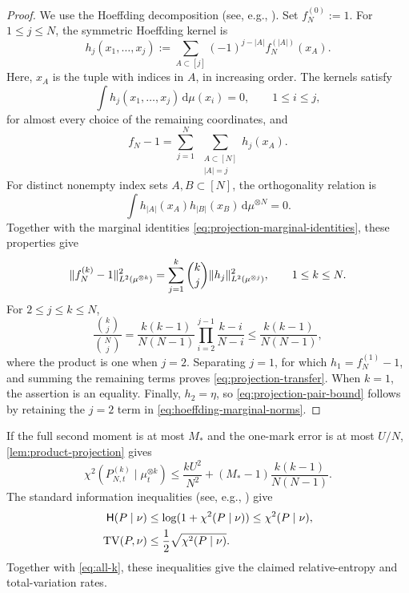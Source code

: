 \documentclass[11pt,reqno]{amsart}
\numberwithin{equation}{section}
\theoremstyle{plain}
\theoremstyle{remark}
\DeclarePairedDelimiter{\norm}{\lVert}{\rVert}
\newcommand{\Hr}{\mathsf H}\newcommand{\dd}{\,\mathrm d}
\begin{document}
\begin{proof}
We use the Hoeffding decomposition (see, e.g., \cite[Section~1.6]{Lee1990}). Set $f_N^{(0)}:=1$. For $1\le j\le N$, the symmetric Hoeffding kernel is
\begin{equation}\label{eq:hoeffding-definition}
 h_j(x_1,\ldots,x_j):=
 \sum_{A\subset[j]}(-1)^{j-|A|}f_N^{(|A|)}(x_A).
\end{equation}
Here, $x_A$ is the tuple with indices in $A$, in increasing order. The kernels satisfy
\begin{equation}\label{eq:hoeffding-centering}
 \int h_j(x_1,\ldots,x_j)\dd\mu(x_i)=0,
       \qquad 1\le i\le j,
\end{equation}
for almost every choice of the remaining coordinates, and
\begin{equation}\label{eq:hoeffding-expansion}
 f_N-1=\sum_{j=1}^N\ \sum_{\substack{A\subset[N]\\|A|=j}}h_j(x_A).
\end{equation}
For distinct nonempty index sets $A,B\subset[N]$, the orthogonality relation is
\begin{equation}\label{eq:hoeffding-orthogonality}
 \int h_{|A|}(x_A)h_{|B|}(x_B)\dd\mu^{\otimes N}=0.
\end{equation}
Together with the marginal identities \eqref{eq:projection-marginal-identities}, these properties give
\begin{equation}\label{eq:hoeffding-marginal-norms}
 \norm{f_N^{(k)}-1}_{L^2(\mu^{\otimes k})}^2
 =\sum_{j=1}^k\binom kj\norm{h_j}_{L^2(\mu^{\otimes j})}^2,
 \qquad 1\le k\le N.
\end{equation}
For $2\le j\le k\le N$,
\begin{equation}\label{eq:hoeffding-ratio}
 \frac{\binom kj}{\binom Nj}
 =\frac{k(k-1)}{N(N-1)}\prod_{i=2}^{j-1}\frac{k-i}{N-i}
 \le\frac{k(k-1)}{N(N-1)},
\end{equation}
where the product is one when $j=2$. Separating $j=1$, for which $h_1=f_N^{(1)}-1$, and summing the remaining terms proves \eqref{eq:projection-transfer}. When $k=1$, the assertion is an equality. Finally, $h_2=\eta$, so \eqref{eq:projection-pair-bound} follows by retaining the $j=2$ term in \eqref{eq:hoeffding-marginal-norms}.
\end{proof}

If the full second moment is at most $M_*$ and the one-mark error is at most $U/N$, \cref{lem:product-projection} gives
\begin{equation}\label{eq:all-k}
 \chi^2(P_{N,t}^{(k)}\mid\mu_t^{\otimes k})
 \le\frac{kU^2}{N^2}+(M_*-1)\frac{k(k-1)}{N(N-1)}.
\end{equation}
The standard information inequalities (see, e.g., \cite[(16), (139)--(141)]{NishiyamaSason2020}) give
\begin{align}
 \Hr(P\mid\nu)&\le\log(1+\chi^2(P\mid\nu))\le\chi^2(P\mid\nu),
                     \label{eq:entropy-TV}\\
 \TV(P,\nu)&\le\frac12\sqrt{\chi^2(P\mid\nu)}.
                     \label{eq:TV-from-square}
\end{align}
Together with \eqref{eq:all-k}, these inequalities give the claimed relative-entropy and total-variation rates.
\end{document}
